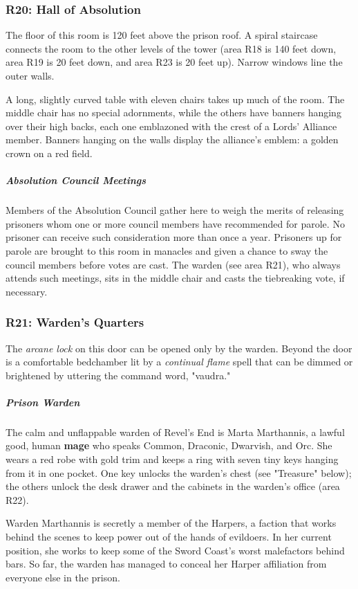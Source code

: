 \documentclass[10pt,a4paper,twoside,bg=print,twocolumn,openany,nodeprecatedcode]{dndbook}
\begin{document}
\subsubsection{R20: Hall of Absolution}
The floor of this room is 120 feet above the prison roof. A spiral staircase connects the room to the other levels of the tower (area R18 is 140 feet down, area R19 is 20 feet down, and area R23 is 20 feet up). Narrow windows line the outer walls.

A long, slightly curved table with eleven chairs takes up much of the room. The middle chair has no special adornments, while the others have banners hanging over their high backs, each one emblazoned with the crest of a Lords' Alliance member. Banners hanging on the walls display the alliance's emblem: a golden crown on a red field.

\subparagraph{Absolution Council Meetings}
Members of the Absolution Council gather here to weigh the merits of releasing prisoners whom one or more council members have recommended for parole. No prisoner can receive such consideration more than once a year. Prisoners up for parole are brought to this room in manacles and given a chance to sway the council members before votes are cast. The warden (see area R21), who always attends such meetings, sits in the middle chair and casts the tiebreaking vote, if necessary.

\subsubsection{R21: Warden's Quarters}
The \textit{arcane lock} on this door can be opened only by the warden. Beyond the door is a comfortable bedchamber lit by a \textit{continual flame} spell that can be dimmed or brightened by uttering the command word, "vaudra."

\subparagraph{Prison Warden}
The calm and unflappable warden of Revel's End is Marta Marthannis, a lawful good, human \textbf{mage} who speaks Common, Draconic, Dwarvish, and Orc. She wears a red robe with gold trim and keeps a ring with seven tiny keys hanging from it in one pocket. One key unlocks the warden's chest (see "Treasure" below); the others unlock the desk drawer and the cabinets in the warden's office (area R22).

Warden Marthannis is secretly a member of the Harpers, a faction that works behind the scenes to keep power out of the hands of evildoers. In her current position, she works to keep some of the Sword Coast's worst malefactors behind bars. So far, the warden has managed to conceal her Harper affiliation from everyone else in the prison.
\end{document}
